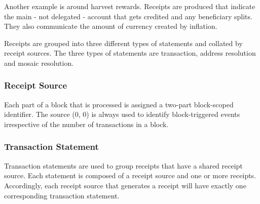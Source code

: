 Another example is around harvest rewards.
Receipts are produced that indicate the main - not delegated - account that gets credited and any beneficiary splits.
They also communicate the amount of currency created by inflation.

Receipts are grouped into three different types of statements and collated by receipt sources.
The three types of statements are transaction, address resolution and mosaic resolution.

\subsubsection{Receipt Source}

Each part of a block that is processed is assigned a two-part block-scoped identifier.
The source (0, 0) is always used to identify block-triggered events irrespective of the number of transactions in a block.

\begin{table}[ht]
\end{table}

\subsubsection{Transaction Statement}

Transaction statements are used to group receipts that have a shared receipt source.
Each statement is composed of a receipt source and one or more receipts.
Accordingly, each receipt source that generates a receipt will have exactly one corresponding transaction statement.

